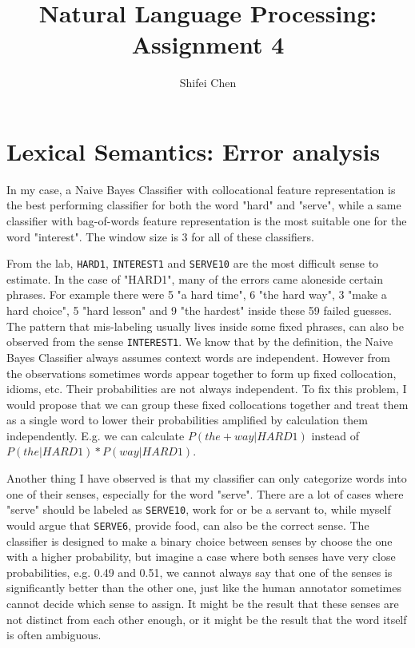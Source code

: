 \documentclass[11pt]{article} %
\title{{\LARGE Natural Language Processing: Assignment 4}\\[1.5mm]} %
\author{Shifei Chen} %
\begin{document}
\maketitle

\section{Lexical Semantics: Error analysis}

In my case, a Naive Bayes Classifier with collocational feature representation is the best performing classifier for both the word "hard" and "serve", while a same classifier with bag-of-words feature representation is the most suitable one for the word "interest". The window size is 3 for all of these classifiers.

From the lab, \texttt{HARD1}, \texttt{INTEREST1} and \texttt{SERVE10} are the most difficult sense to estimate. In the case of "HARD1", many of the errors came aloneside certain phrases. For example there were 5 "a hard time", 6 "the hard way", 3 "make a hard choice", 5 "hard lesson" and 9 "the hardest" inside these 59 failed guesses. The pattern that mis-labeling usually lives inside some fixed phrases, can also be observed from the sense \texttt{INTEREST1}. We know that by the definition, the Naive Bayes Classifier always assumes context words are independent. However from the observations sometimes words appear together to form up fixed collocation, idioms, etc. Their probabilities are not always independent. To fix this problem, I would propose that we can group these fixed collocations together and treat them as a single word to lower their probabilities amplified by calculation them independently. E.g. we can calculate $P(the+way|HARD1)$ instead of $P(the|HARD1)*P(way|HARD1)$.

Another thing I have observed is that my classifier can only categorize words into one of their senses, especially for the word "serve". There are a lot of cases where "serve" should be labeled as \texttt{SERVE10}, work for or be a servant to, while myself would argue that \texttt{SERVE6}, provide food, can also be the correct sense. The classifier is designed to make a binary choice between senses by choose the one with a higher probability, but imagine a case where both senses have very close probabilities, e.g. 0.49 and 0.51, we cannot always say that one of the senses is significantly better than the other one, just like the human annotator sometimes cannot decide which sense to assign. It might be the result that these senses are not distinct from each other enough, or it might be the result that the word itself is often ambiguous.
\end{document}
